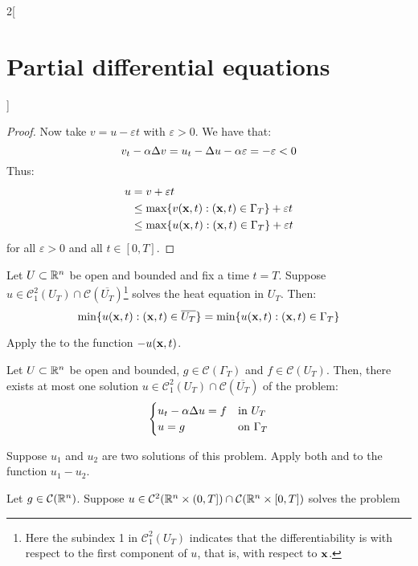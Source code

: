 \documentclass[../../../main_math.tex]{subfiles}
\begin{document}
\begin{multicols}{2}[\section{Partial differential equations}]
\begin{proof}
    Now take $v=u-\varepsilon t$ with $\varepsilon>0$. We have that: $$v_t-\alpha \Delta v=u_t-\Delta u -\alpha\varepsilon = -\varepsilon <0$$
    Thus:
    \begin{align*}
      u & =v+\varepsilon t                                              \\
        & \leq \max\{v(\boldsymbol{\mathrm{x}},t):(\boldsymbol{\mathrm{x}},t)\in\Gamma_T\} +\varepsilon t \\
        & \leq \max\{u(\boldsymbol{\mathrm{x}},t):(\boldsymbol{\mathrm{x}},t)\in\Gamma_T\} +\varepsilon t
    \end{align*}
    for all $\varepsilon >0$ and all $t\in[0,T]$.
  \end{proof}
  \begin{theorem}\label{PDE:min}
    Let $U\subset\mathbb{R}^n$ be open and bounded and fix a time $t=T$. Suppose $u\in\mathcal{C}_1^2(U_T)\cap\mathcal{C}(\overline{U_T})$\footnote{Here the subindex 1 in $\mathcal{C}_1^2(U_T)$ indicates that the differentiability is with respect to the first component of $u$, that is, with respect to $\boldsymbol{\mathrm{x}}$.} solves the heat equation in $U_T$. Then:
    $$\min\{u(\boldsymbol{\mathrm{x}},t):(\boldsymbol{\mathrm{x}},t)\in\overline{U_T}\}=\min\{u(\boldsymbol{\mathrm{x}},t):(\boldsymbol{\mathrm{x}},t)\in\Gamma_T\}$$
  \end{theorem}
  \begin{sproof}
    Apply the  to the function $-u(\boldsymbol{\mathrm{x}},t)$.
  \end{sproof}
  \begin{theorem}
    Let $U\subset\mathbb{R}^n$ be open and bounded, $g\in\mathcal{C}(\Gamma_T)$ and $f\in\mathcal{C}(U_T)$. Then, there exists at most one solution $u\in\mathcal{C}_1^2(U_T)\cap\mathcal{C}(\overline{U_T})$ of the problem:
    $$
      \begin{cases}
        u_{t}  -\alpha\Delta{u} = f & \text{in $U_T$}      \\
        u=g                             & \text{on $\Gamma_T$}
      \end{cases}
    $$
  \end{theorem}
  \begin{sproof}
    Suppose $u_1$ and $u_2$ are two solutions of this problem. Apply both  and  to the function $u_1-u_2$.
  \end{sproof}
  \begin{theorem}\label{PDE:maxunbounded}
    Let $g\in\mathcal{C}(\mathbb{R}^n)$. Suppose $u\in\mathcal{C}^2(\mathbb{R}^n\times (0,T])\cap\mathcal{C}(\mathbb{R}^n\times [0,T])$ solves the problem

\end{theorem}
\end{multicols}
\end{document}
